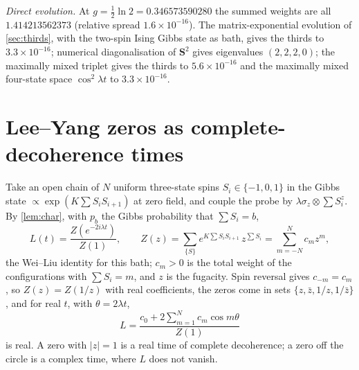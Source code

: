 \documentclass[11pt]{article}
\theoremstyle{definition}\newtheorem{definition}[theorem]{Definition}
\theoremstyle{remark}\newtheorem{remark}[theorem]{Remark}
\begin{document}
\emph{Direct evolution.} At $g=\frac12\ln2=0.346573590280$ the summed weights are all $1.414213562373$ (relative spread $1.6\times10^{-16}$). The matrix-exponential evolution of \cref{sec:thirds}, with the two-spin Ising Gibbs state as bath, gives the thirds to $3.3\times10^{-16}$; numerical diagonalisation of $\mathbf S^2$ gives eigenvalues $(2,2,2,0)$; the maximally mixed triplet gives the thirds to $5.6\times10^{-16}$ and the maximally mixed four-state space $\cos^2\lambda t$ to $3.3\times10^{-16}$.

\section{Lee--Yang zeros as complete-decoherence times}\label{sec:ly}
Take an open chain of $N$ uniform three-state spins $S_i\in\{-1,0,1\}$ in the Gibbs state $\propto\exp(K\sum S_iS_{i+1})$ at zero field, and couple the probe by $\lambda\sigma_z\otimes\sum S_i^z$. By \cref{lem:char}, with $p_b$ the Gibbs probability that $\sum S_i=b$,
\[
L(t)=\frac{Z(e^{-2i\lambda t})}{Z(1)},\qquad Z(z)=\sum_{\{S\}}e^{K\sum S_iS_{i+1}}\,z^{\sum S_i}=\sum_{m=-N}^{N}c_mz^m,
\]
the Wei--Liu identity \cite{WeiLiu} for this bath; $c_m>0$ is the total weight of the configurations with $\sum S_i=m$, and $z$ is the fugacity. Spin reversal gives $c_{-m}=c_m$, so $Z(z)=Z(1/z)$ with real coefficients, the zeros come in sets $\{z,\bar z,1/z,1/\bar z\}$, and for real $t$, with $\theta=2\lambda t$,
\[
L=\frac{c_0+2\sum_{m=1}^{N}c_m\cos m\theta}{Z(1)}
\]
is real. A zero with $|z|=1$ is a real time of complete decoherence; a zero off the circle is a complex time, where $L$ does not vanish.
\end{document}
